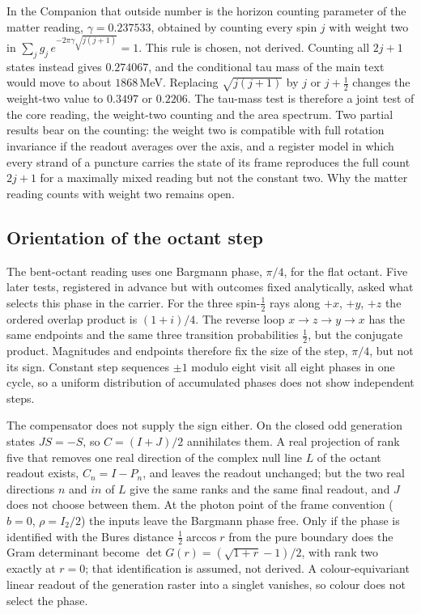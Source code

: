 In the Companion that outside number is the horizon counting
parameter of the matter reading, $\gamma=0.237533$, obtained by
counting every spin $j$ with weight two in
$\sum_j g_j\,e^{-2\pi\gamma\sqrt{j(j+1)}}=1$. This rule is chosen, not
derived. Counting all $2j+1$ states instead gives $0.274067$, and the
conditional tau mass of the main text would move to about
$1868$\,MeV. Replacing $\sqrt{j(j+1)}$ by $j$ or $j+\tfrac12$ changes
the weight-two value to $0.3497$ or $0.2206$. The tau-mass test is
therefore a joint test of the core reading, the weight-two counting
and the area spectrum. Two partial results bear on the counting: the
weight two is compatible with full rotation invariance if the readout
averages over the axis, and a register model in which every strand of
a puncture carries the state of its frame reproduces the full count
$2j+1$ for a maximally mixed reading but not the constant two. Why the
matter reading counts with weight two remains open.

\subsection{Orientation of the octant step}

The bent-octant reading uses one Bargmann phase, $\pi/4$, for the flat
octant. Five later tests, registered in advance but with outcomes fixed
analytically, asked what selects this phase in the carrier. For the
three spin-$\tfrac12$ rays along $+x$, $+y$, $+z$ the ordered overlap
product is $(1+i)/4$. The reverse loop $x\to z\to y\to x$ has the same
endpoints and the same three transition probabilities $\tfrac12$, but
the conjugate product. Magnitudes and endpoints therefore fix the size
of the step, $\pi/4$, but not its sign. Constant step sequences
$\pm1$ modulo eight visit all eight phases in one cycle, so a uniform
distribution of accumulated phases does not show independent steps.

The compensator does not supply the sign either. On the closed odd
generation states $JS=-S$, so $C=(I+J)/2$ annihilates them. A real
projection of rank five that removes one real direction of the complex
null line $L$ of the octant readout exists, $C_n=I-P_n$, and leaves the
readout unchanged; but the two real directions $n$ and $in$ of $L$ give
the same ranks and the same final readout, and $J$ does not choose
between them. At the photon point of the frame convention ($b=0$,
$\rho=I_2/2$) the inputs leave the Bargmann phase free. Only if the
phase is identified with the Bures distance $\tfrac12\arccos r$ from
the pure boundary does the Gram determinant become
$\det G(r)=(\sqrt{1+r}-1)/2$, with rank two exactly at $r=0$; that
identification is assumed, not derived. A colour-equivariant linear
readout of the generation raster into a singlet vanishes, so colour
does not select the phase.

